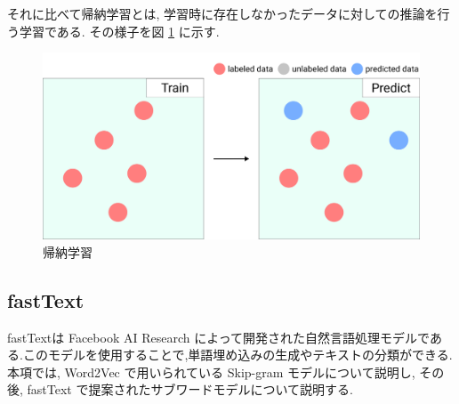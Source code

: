 \documentclass[a4j,twoside,12pt,dvipdfmx]{thesis} %
\begin{document}
それに比べて帰納学習とは, 学習時に存在しなかったデータに対しての推論を行う学習である. その様子を図 \ref{fig:Inductive} に示す.


\begin{figure}
  \centering
  \includegraphics[width=\linewidth]
  {img/Inductive.jpg}
  \caption{帰納学習}
  \label{fig:Inductive}
\end{figure}


\subsection{fastText}
fastText\cite{bojanowski2017enriching}は Facebook AI Research によって開発された自然言語処理モデルである.このモデルを使用することで,単語埋め込みの生成やテキストの分類ができる.
本項では, Word2Vec で用いられている Skip-gram モデルについて説明し, その後, fastText で提案されたサブワードモデルについて説明する.
\end{document}
